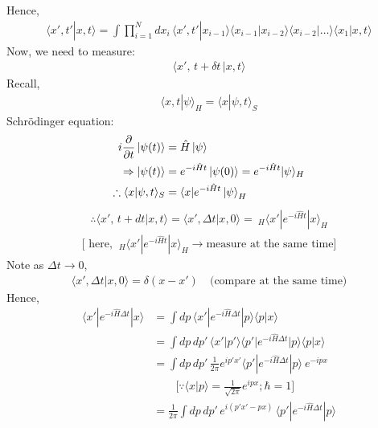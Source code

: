 \documentclass[14pt]{article} %
\begin{document}
\noindent
Hence,
\begin{align*}
\langle x', t' | x, t \rangle = \int \prod_{i=1}^N dx_i \, \langle x', t' | x_{i-1} \rangle \langle x_{i-1}| x_{i-2} \rangle \langle x_{i-2}| \dots \rangle \langle x_1 | x, t \rangle
\end{align*}
Now, we need to measure:
\begin{align*}
\langle x',\, t + \delta t \,| x, t \rangle
\end{align*}
Recall,
\begin{align*}
\langle x, t | \psi \rangle_H = \langle x | \psi, t \rangle_S
\end{align*}
Schrödinger equation:
\begin{align*}
i \frac{\partial}{\partial t} \ket{\psi(t)} &= \hat{H} \ket{\psi} \\
\Rightarrow \ket{\psi(t)} &= e^{-i \hat{H} t}  \ket{\psi(0)} = e^{- i \hat{H}t } |\psi \rangle_H \\
\therefore  \langle x | \psi, t \rangle_S &= \langle x | e^{-i \hat{H} t} \ket{\psi}_H
\end{align*}
\begin{align*}
\boxed{\therefore \langle x',\, t + dt | x, t \rangle 
= \langle x', \Delta t | x,0 \rangle =  ~_H\langle x' | e^{-i \hat{H} t} | x \rangle_H}
\end{align*}
\begin{align*}
\big[ \text{ here, } ~_H\langle x' | e^{-i \hat{H} t} | x \rangle_H \to \text{measure at the same time} \big]
\end{align*}
Note as $\Delta t \to 0$,
\begin{align*}
\langle x', \Delta t | x,0 \rangle = \delta(x - x') \quad \text{(compare at the same time)}
\end{align*}
Hence,
\begin{align*}
\langle x' | e^{-i \hat{H} \Delta t} | x \rangle &= \int dp \, \langle x' | e^{-i \hat{H} \Delta t} |p \rangle \langle p | x \rangle \\
&= \int dp \, dp' \, \langle x' | p' \rangle \langle p' | e^{-i \hat{H} \Delta t} | p \rangle \langle p | x \rangle \\
&= \int dp \, dp' \, \frac{1}{2\pi} e^{ip'x'} \langle p' | e^{-i \hat{H} \Delta t} | p \rangle ~e^{-ipx} \\
&\quad \quad \big[ \because \langle x|p \rangle = \frac{1}{\sqrt{2 \pi}} e^{ipx} ; \hbar=1 \big] \\
&= \frac{1}{2\pi}\int dp \, dp' \,  e^{i(p'x'-px)}\, \langle p' | e^{-i \hat{H} \Delta t} | p \rangle \\
\end{align*}
\end{document}
